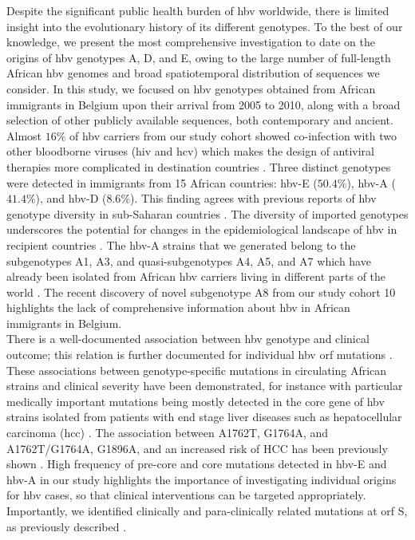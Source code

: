 Despite the significant public health burden of \gls{hbv} worldwide, there is limited insight into the evolutionary history of its different genotypes.
To the best of our knowledge, we present the most comprehensive investigation to date on the origins of \gls{hbv} genotypes A, D, and E, owing to the large number of full-length African \gls{hbv} genomes and broad spatiotemporal distribution of sequences we consider.
In this study, we focused on \gls{hbv} genotypes obtained from African immigrants in Belgium upon their arrival from 2005 to 2010, along with a broad selection of other publicly available sequences, both contemporary and ancient.
Almost $16\%$ of \gls{hbv} carriers from our study cohort showed co-infection with two other bloodborne viruses (\gls{hiv} and \gls{hcv}) which makes the design of antiviral therapies more complicated in destination countries \citep{arora_complexities_2021,torimiro_rates_2018}.
Three distinct genotypes were detected in immigrants from 15 African countries: \gls{hbv}-E ($50.4\%$), \gls{hbv}-A ($41.4\%$), and \gls{hbv}-D ($8.6\%$).
This finding agrees with previous reports of \gls{hbv} genotype diversity in sub-Saharan countries \citep{forbi_disparate_2013,andernach_slave_2009}.
The diversity of imported genotypes underscores the potential for changes in the epidemiological landscape of \gls{hbv} in recipient countries \citep{mina_15year_2017,aguilera_gehep_2020}.
The \gls{hbv}-A strains that we generated belong to the subgenotypes A1, A3, and quasi-subgenotypes A4, A5, and A7 which have already been isolated from African \gls{hbv} carriers living in different parts of the world \citep{andernach_slave_2009,kurbanov_new_2005,olinger_phylogenetic_2006,pourkarim_novel_2010}.
The recent discovery of novel subgenotype A8 from our study cohort 10 highlights the lack of comprehensive information about \gls{hbv} in African immigrants in Belgium.\\

There is a well-documented association between \gls{hbv} genotype and clinical outcome; this relation is further documented for individual \gls{hbv} \gls{orf} mutations \citep{mina_genomic_2015,mina_15year_2017,liu_associations_2009,mello_hepatitis_2014,hou_hcc-associated_2019}.
These associations between genotype-specific mutations in circulating African strains and clinical severity have been demonstrated, for instance with particular medically important mutations being mostly detected in the core gene of \gls{hbv} strains isolated from patients with end stage liver diseases such as hepatocellular carcinoma (\gls{hcc}) \citep{amougou_enrichment_2019,mbamalu_hepatitis_2021,mak_molecular_2020}.
The association between A1762T, G1764A, and A1762T/G1764A, G1896A, and an increased risk of HCC has been previously shown \citep{wei_association_2017}.
High frequency of pre-core and core mutations detected in \gls{hbv}-E and \gls{hbv}-A in our study highlights the importance of investigating individual origins for \gls{hbv} cases, so that clinical interventions can be targeted appropriately.
Importantly, we identified clinically and para-clinically related mutations at \gls{orf} S, as previously described \citep{olusola_profiles_2021,mak_molecular_2020,lin_hepatitis_2021}.\\

